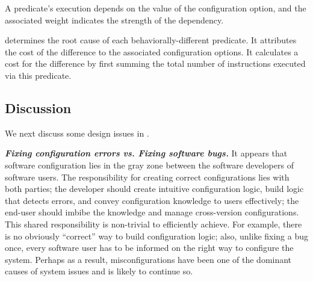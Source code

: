 %







A predicate's execution depends on the value of
the configuration option, and the associated weight
indicates the strength of the dependency.



\ourtool determines the root cause of each behaviorally-different
predicate.  It attributes the cost of the difference 
to the associated configuration options.
It calculates a cost for the difference by first summing
the total number of instructions executed via this
predicate. 




\subsection{Discussion}

We next discuss some design issues in \ourtool.

\vspace{1mm}

\noindent \textbf{\textit{Fixing configuration errors vs. Fixing software bugs.}}
It appears that software configuration lies in the gray zone between
the software developers of software users.
The responsibility for creating correct configurations
lies with both parties; the developer should create
intuitive configuration logic, build logic that detects
errors, and convey configuration knowledge to users
effectively;  the end-user should imbibe the
knowledge and manage cross-version configurations.
This shared responsibility is non-trivial to efficiently
achieve. For example, there is no obviously ``correct'' way to
build configuration logic; also, unlike fixing a bug once,
every software user has to be informed on the right way to
configure the system. Perhaps as a result, misconfigurations
have been one of the dominant causes of system issues and
is likely to continue so.

